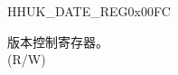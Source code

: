 \begin{register}{H}{HUK\_DATE\_REG}{0x00FC}\label{regdesc:HUKDATEREG}
%
%
\regnewline%
\begin{regdesc}\begin{reglist}
\label{fielddesc:HUKDATE}\item [HUK\_DATE] 版本控制寄存器。 \\
(R/W)
\end{reglist}\end{regdesc}
\end{register}

